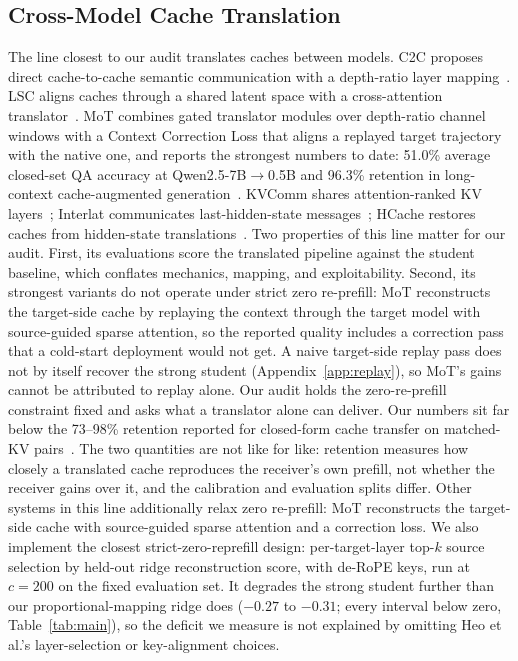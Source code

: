 \documentclass{article} %
\begin{document}
\subsection{Cross-Model Cache Translation}
The line closest to our audit translates caches between models. C2C proposes
direct cache-to-cache semantic communication with a depth-ratio layer
mapping~\citep{c2c2025}. LSC aligns caches through a shared latent space with
a cross-attention translator~\citep{lsc2026}. MoT combines gated translator
modules over depth-ratio channel windows with a Context Correction Loss that
aligns a replayed target trajectory with the native one, and reports the
strongest numbers to date: 51.0\% average closed-set QA accuracy at
Qwen2.5-7B$\to$0.5B and 96.3\% retention in long-context cache-augmented
generation~\citep{mot2026}. KVComm shares attention-ranked KV
layers~\citep{kvcomm2025}; Interlat communicates last-hidden-state
messages~\citep{interlat2025}; HCache restores caches from hidden-state
translations~\citep{hcache2025}. Two properties of this line matter for our
audit. First, its evaluations score the translated pipeline against the
student baseline, which conflates mechanics, mapping, and exploitability.
Second, its strongest variants do not operate under strict zero re-prefill:
MoT reconstructs the target-side cache by replaying the context through the
target model with source-guided sparse attention, so the reported quality
includes a correction pass that a cold-start deployment would not get. A naive
target-side replay pass does not by itself recover the strong student
(Appendix~\ref{app:replay}), so MoT's gains cannot be attributed to replay
alone. Our audit holds the zero-re-prefill constraint fixed and asks what a
translator alone can deliver. Our numbers sit far below the 73--98\% retention
reported for closed-form cache transfer on matched-KV
pairs~\citep{heo2026}. The two quantities are not like for like: retention
measures how closely a translated cache reproduces the receiver's own prefill,
not whether the receiver gains over it, and the calibration and evaluation
splits differ. Other systems in this line additionally relax zero re-prefill:
MoT reconstructs the target-side cache with source-guided sparse attention and
a correction loss. We also implement the closest strict-zero-reprefill design:
per-target-layer top-$k$ source selection by held-out ridge reconstruction
score, with de-RoPE keys, run at $c{=}200$ on the fixed evaluation set. It
degrades the strong student further than our proportional-mapping ridge does
($-0.27$ to $-0.31$; every interval below zero, Table~\ref{tab:main}), so the
deficit we measure is not explained by omitting Heo et al.'s layer-selection or
key-alignment choices.
\end{document}
